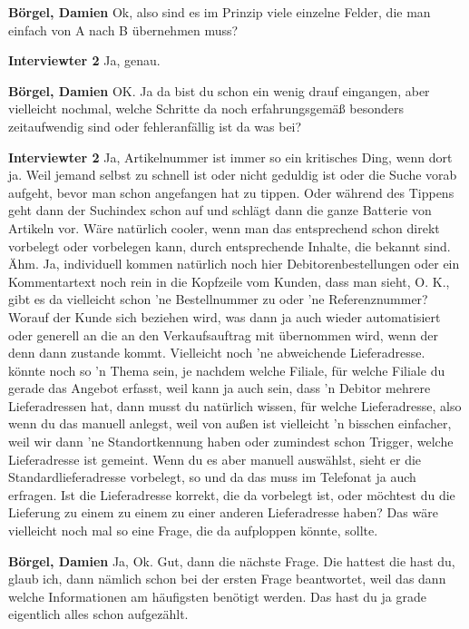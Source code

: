 \textbf{Börgel, Damien}\newline
Ok, also sind es im Prinzip viele einzelne Felder, die man einfach von A nach B übernehmen muss?

\textbf{Interviewter 2}\newline
Ja, genau.

\textbf{Börgel, Damien}\newline
OK. 
Ja da bist du schon ein wenig drauf eingangen, aber vielleicht nochmal, welche Schritte da noch erfahrungsgemäß besonders zeitaufwendig sind oder fehleranfällig ist da was bei?

\textbf{Interviewter 2}\newline
Ja, Artikelnummer ist immer so ein kritisches Ding, wenn dort ja.
Weil jemand selbst zu schnell ist oder nicht geduldig ist oder die Suche vorab aufgeht, bevor man schon angefangen hat zu tippen. Oder während des Tippens geht dann der Suchindex schon auf und schlägt dann die ganze Batterie von Artikeln vor. Wäre natürlich cooler, wenn man das entsprechend schon direkt vorbelegt oder vorbelegen kann, durch entsprechende Inhalte, die bekannt sind.
Ähm.
Ja, individuell kommen natürlich noch hier Debitorenbestellungen oder ein Kommentartext noch rein in die Kopfzeile vom Kunden, dass man sieht, O. K., gibt es da vielleicht schon 'ne Bestellnummer zu oder 'ne Referenznummer?
Worauf der Kunde sich beziehen wird, was dann ja auch wieder automatisiert oder generell an die an den Verkaufsauftrag mit übernommen wird, wenn der denn dann zustande kommt.
Vielleicht noch 'ne abweichende Lieferadresse.
könnte noch so 'n Thema sein, je nachdem welche Filiale, für welche Filiale du gerade das Angebot erfasst, weil kann ja auch sein, dass 'n Debitor mehrere Lieferadressen hat, dann musst du natürlich wissen, für welche Lieferadresse, also wenn du das manuell anlegst, weil von außen ist vielleicht 'n bisschen einfacher, weil wir dann 'ne Standortkennung haben oder zumindest schon Trigger, welche Lieferadresse ist gemeint. Wenn du es aber manuell auswählst, sieht er die Standardlieferadresse vorbelegt, so und da das muss im Telefonat ja auch erfragen.
Ist die Lieferadresse korrekt, die da vorbelegt ist, oder möchtest du die Lieferung zu einem zu einem zu einer anderen Lieferadresse haben? Das wäre vielleicht noch mal so eine Frage, die da aufploppen könnte, sollte.

\textbf{Börgel, Damien}\newline
Ja, Ok.
Gut, dann die nächste Frage. Die hattest die hast du, glaub ich, dann nämlich schon bei der ersten Frage beantwortet, weil das dann welche Informationen am häufigsten benötigt werden. Das hast du ja grade eigentlich alles schon aufgezählt.

